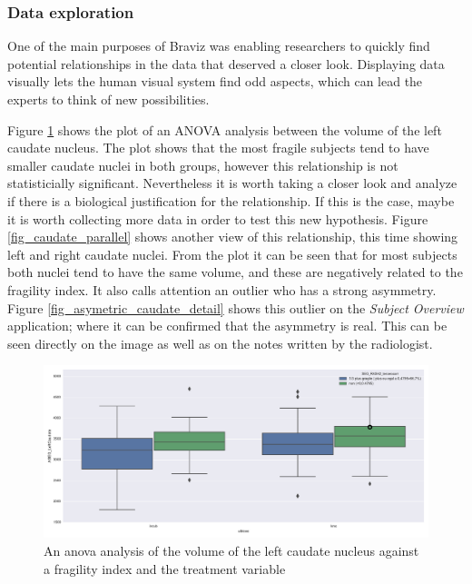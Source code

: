 
\subsubsection{Data exploration}

One of the main purposes of Braviz was enabling researchers to quickly find potential relationships in the data that deserved a closer look. Displaying data visually lets the human visual system find odd aspects, which can lead the experts to think of new possibilities. 

Figure \ref{fig_anova_example} shows the plot of an ANOVA analysis between the volume of the left caudate nucleus. The plot shows that the most fragile subjects tend to have smaller caudate nuclei in both groups, however this relationship is not statisticially significant. Nevertheless it is worth taking a closer look and analyze if there is a biological justification for the relationship. If this is the case, maybe it is worth collecting more data in order to test this new hypothesis. Figure \ref{fig_caudate_parallel} shows another view of this relationship, this time showing left and right caudate nuclei. From the plot it can be seen that for most subjects both nuclei tend to have the same volume, and these are negatively related to the fragility index. It also calls attention an outlier who has a strong asymmetry. Figure \ref{fig_asymetric_caudate_detail} shows this outlier on the \emph{Subject Overview} application; where it can be confirmed that the asymmetry is real. This can be seen directly on the image as well as on the notes written by the radiologist.


\begin{figure}
	\centering
		\includegraphics[width=\textwidth]{figures/kmc400/left_caudate_fragility_anova}
	\caption{An anova analysis of the volume of the left caudate nucleus against a fragility index and the treatment variable}
	\label{fig_anova_example}
\end{figure}


